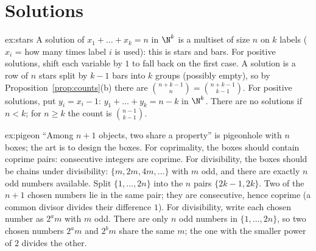 \section{Solutions}
\begin{solution}{ex:stars}
\idea A solution of $x_1+\dots+x_k=n$ in $\N^k$ is a multiset of size $n$ on $k$ labels ($x_i$ = how many times label $i$ is used): this is stars and bars. For positive solutions, shift each variable by $1$ to fall back on the first case.
\writeup A solution is a row of $n$ stars split by $k-1$ bars into $k$ groups (possibly empty), so by Proposition~\ref{prop:counts}(b) there are $\binom{n+k-1}{n}=\binom{n+k-1}{k-1}$. For positive solutions, put $y_i=x_i-1$:
$y_1+\dots+y_k=n-k$ in $\N^k$. There are no solutions if $n<k$; for $n\ge k$ the count is $\binom{n-1}{k-1}$.
\end{solution}

\begin{solution}{ex:pigeon}
\idea ``Among $n+1$ objects, two share a property'' is pigeonhole with $n$ boxes; the art is to design the boxes. For coprimality, the boxes should contain coprime pairs: consecutive integers are coprime. For divisibility, the boxes should be chains under divisibility: $\{m,2m,4m,\dots\}$ with $m$ odd, and there are exactly $n$ odd numbers available.
\writeup Split $\{1,\dots,2n\}$ into the $n$ pairs $\{2k-1,2k\}$. Two of the $n+1$ chosen numbers lie in the same pair; they are consecutive, hence coprime (a common divisor divides their difference $1$).
For divisibility, write each chosen number as $2^am$ with $m$ odd. There are only $n$ odd numbers in $\{1,\dots,2n\}$, so two chosen numbers $2^am$ and $2^bm$ share the same $m$;
the one with the smaller power of $2$ divides the other.
\end{solution}

